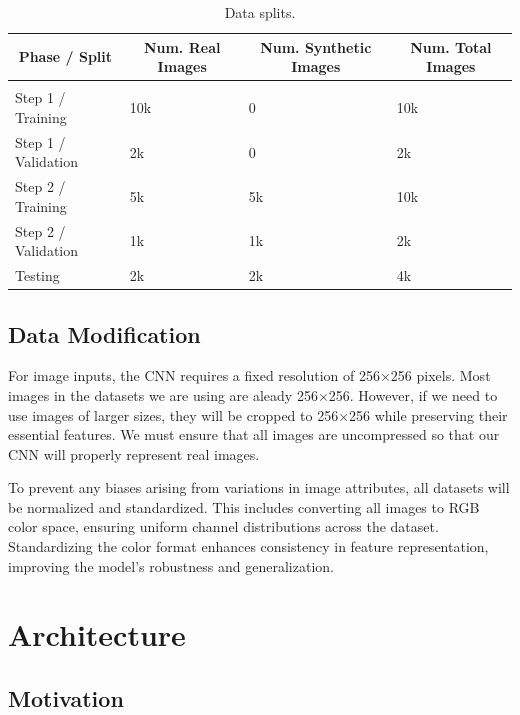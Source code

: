 \documentclass{article} %
\begin{document}
    \begin{table}[t]
    \caption{Data splits.}
    \label{data_splits}
    \begin{center}
    \begin{tabular}{llll}
    \multicolumn{1}{c}{\bf Phase / Split} & \multicolumn{1}{c}{\bf Num. Real Images}    & \multicolumn{1}{c}{\bf Num. Synthetic Images} & \multicolumn{1}{c}{\bf Num. Total Images}
    \\ \hline \\
    Step 1 / Training       & 10k   & 0     & 10k \\
    Step 1 / Validation     & 2k    & 0     & 2k \\
    Step 2 / Training       & 5k    & 5k    & 10k \\
    Step 2 / Validation     & 1k    & 1k    & 2k \\
    Testing                 & 2k    & 2k    & 4k \\             
    \end{tabular}
    \end{center}
    \end{table}

\subsection{Data Modification}
\label{data_mod}
For image inputs, the CNN requires a fixed resolution of 256×256 pixels. Most images in the datasets we are using are aleady 256×256. However, if we need to use images of larger sizes, they will be cropped to 256×256 while preserving their essential features. We must ensure that all images are uncompressed so that our CNN will properly represent real images.

To prevent any biases arising from variations in image attributes, all datasets will be normalized and standardized. This includes converting all images to RGB color space, ensuring uniform channel distributions across the dataset. Standardizing the color format enhances consistency in feature representation, improving the model's robustness and generalization.

\section{Architecture}
\label{arch}
\subsection{Motivation}
\end{document}
